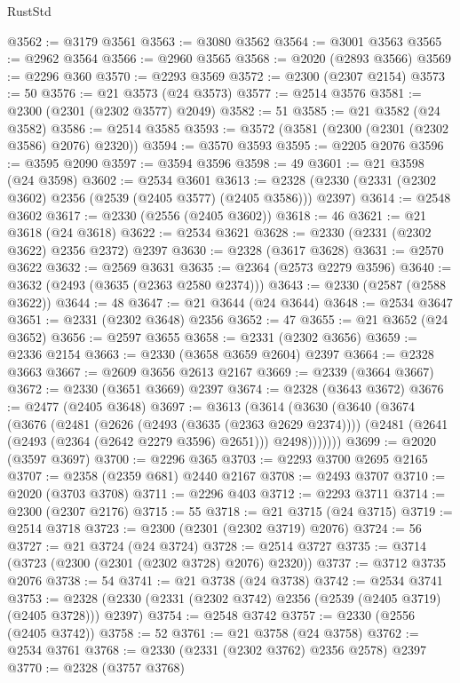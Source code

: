\begin{lexlean}{RustStd}
\begin{coremodule}
@3562 := @3179 @3561
@3563 := @3080 @3562
@3564 := @3001 @3563
@3565 := @2962 @3564
@3566 := @2960 @3565
@3568 := @2020 (@2893 @3566)
@3569 := @2296 @360
@3570 := @2293 @3569
@3572 := @2300 (@2307 @2154)
@3573 := 50
@3576 := @21 @3573 (@24 @3573)
@3577 := @2514 @3576
@3581 := @2300 (@2301 (@2302 @3577) @2049)
@3582 := 51
@3585 := @21 @3582 (@24 @3582)
@3586 := @2514 @3585
@3593 := @3572 (@3581 (@2300 (@2301 (@2302 @3586) @2076) @2320))
@3594 := @3570 @3593
@3595 := @2205 @2076
@3596 := @3595 @2090
@3597 := @3594 @3596
@3598 := 49
@3601 := @21 @3598 (@24 @3598)
@3602 := @2534 @3601
@3613 := @2328 (@2330 (@2331 (@2302 @3602) @2356 (@2539 (@2405 @3577) (@2405 @3586))) @2397)
@3614 := @2548 @3602
@3617 := @2330 (@2556 (@2405 @3602))
@3618 := 46
@3621 := @21 @3618 (@24 @3618)
@3622 := @2534 @3621
@3628 := @2330 (@2331 (@2302 @3622) @2356 @2372) @2397
@3630 := @2328 (@3617 @3628)
@3631 := @2570 @3622
@3632 := @2569 @3631
@3635 := @2364 (@2573 @2279 @3596)
@3640 := @3632 (@2493 (@3635 (@2363 @2580 @2374)))
@3643 := @2330 (@2587 (@2588 @3622))
@3644 := 48
@3647 := @21 @3644 (@24 @3644)
@3648 := @2534 @3647
@3651 := @2331 (@2302 @3648) @2356
@3652 := 47
@3655 := @21 @3652 (@24 @3652)
@3656 := @2597 @3655
@3658 := @2331 (@2302 @3656)
@3659 := @2336 @2154
@3663 := @2330 (@3658 @3659 @2604) @2397
@3664 := @2328 @3663
@3667 := @2609 @3656 @2613 @2167
@3669 := @2339 (@3664 @3667)
@3672 := @2330 (@3651 @3669) @2397
@3674 := @2328 (@3643 @3672)
@3676 := @2477 (@2405 @3648)
@3697 := @3613
    (@3614
      (@3630
        (@3640
          (@3674
            (@3676
              (@2481
                (@2626 (@2493 (@3635 (@2363 @2629 @2374))))
                (@2481 (@2641 (@2493 (@2364 (@2642 @2279 @3596) @2651))) @2498)))))))
@3699 := @2020 (@3597 @3697)
@3700 := @2296 @365
@3703 := @2293 @3700 @2695 @2165
@3707 := @2358 (@2359 @681) @2440 @2167
@3708 := @2493 @3707
@3710 := @2020 (@3703 @3708)
@3711 := @2296 @403
@3712 := @2293 @3711
@3714 := @2300 (@2307 @2176)
@3715 := 55
@3718 := @21 @3715 (@24 @3715)
@3719 := @2514 @3718
@3723 := @2300 (@2301 (@2302 @3719) @2076)
@3724 := 56
@3727 := @21 @3724 (@24 @3724)
@3728 := @2514 @3727
@3735 := @3714 (@3723 (@2300 (@2301 (@2302 @3728) @2076) @2320))
@3737 := @3712 @3735 @2076
@3738 := 54
@3741 := @21 @3738 (@24 @3738)
@3742 := @2534 @3741
@3753 := @2328 (@2330 (@2331 (@2302 @3742) @2356 (@2539 (@2405 @3719) (@2405 @3728))) @2397)
@3754 := @2548 @3742
@3757 := @2330 (@2556 (@2405 @3742))
@3758 := 52
@3761 := @21 @3758 (@24 @3758)
@3762 := @2534 @3761
@3768 := @2330 (@2331 (@2302 @3762) @2356 @2578) @2397
@3770 := @2328 (@3757 @3768)

\end{coremodule}
\end{lexlean}
